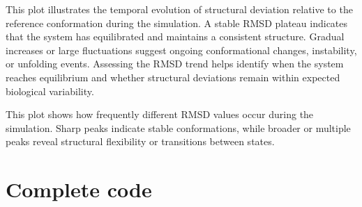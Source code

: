 \documentclass[a4paper,10pt,english]{sphinxmanual}
\let\sphinxpxdimen\pdfpxdimen\else\newdimen\sphinxpxdimen
\begin{document}
\noindent{}

\sphinxAtStartPar
{} This plot illustrates the temporal evolution of structural deviation relative to the reference conformation during the simulation. A stable RMSD plateau indicates that the system has equilibrated and maintains a consistent structure. Gradual increases or large fluctuations suggest ongoing conformational changes, instability, or unfolding events. Assessing the RMSD trend helps identify when the system reaches equilibrium and whether structural deviations remain within expected biological variability.

\begin{sphinxVerbatim}[commandchars=\\\{\}]
  
\end{sphinxVerbatim}

\noindent{\hspace*{\fill}\sphinxincludegraphics[width=500\sphinxpxdimen]{{RMSD_density}.png}\hspace*{\fill}}

\sphinxAtStartPar
{} This plot shows how frequently different RMSD values occur during the simulation. Sharp peaks indicate stable conformations, while broader or multiple peaks reveal structural flexibility or transitions between states.


\section{Complete code}
\label{\detokenize{RMSD:complete-code}}
\begin{sphinxVerbatim}[commandchars=\\\{\}]
 
\end{sphinxVerbatim}

\begin{sphinxVerbatim}[commandchars=\\\{\}]
\end{sphinxVerbatim}
\end{document}
